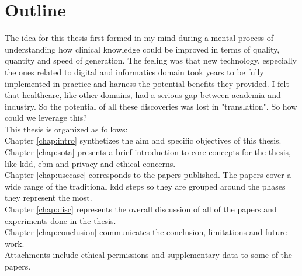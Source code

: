 \chapter*{Outline}


The idea for this thesis first formed in my mind during a mental process of understanding how clinical knowledge could be improved in terms of quality, quantity and speed of generation. The feeling was that new technology, especially the ones related to digital and informatics domain took years to be fully implemented in practice and harness the potential benefits they provided. I felt that healthcare, like other domains, had a serious gap between academia and industry. So the potential of all these discoveries was lost in "translation".
So how could we leverage this? \\
This thesis is organized as follows:\\
Chapter \ref{chap:intro} synthetizes the aim and specific objectives of this thesis.
Chapter \ref{chap:sota} presents a brief introduction to core concepts for the thesis, like \ac{kdd}, \ac{ebm} and privacy and ethical concerns.\\
Chapter \ref{chap:usecase} corresponds to the papers published. The papers cover a wide range of the traditional \ac{kdd} steps  so they are grouped around the phases they represent the most.\\

Chapter \ref{chap:disc} represents the overall discussion of all of the papers and experiments done in the thesis.\\

Chapter \ref{chap:conclusion} communicates the conclusion, limitations and future work.\\

Attachments include ethical permissions and supplementary data to some of the papers.
